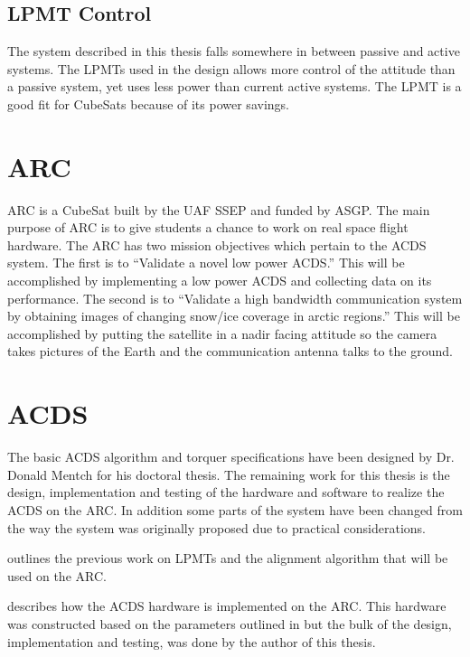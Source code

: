 \subsection{\acl*{LPMT} Control}

The system described in this thesis falls somewhere in between passive and active systems. The \acp{LPMT} used in the design allows more control of the attitude than a passive system, yet uses less power than current active systems. The \ac{LPMT} is a good fit for CubeSats because of its power savings.

\section{\acl*{ARC}}

\ac{ARC} is a CubeSat built by the UAF \ac{SSEP} and funded by \ac{ASGP}. The main purpose of \ac{ARC} is to give students a chance to work on real space flight hardware. The \ac{ARC} has two mission objectives which pertain to the \ac{ACDS} system. The first is to \enquote{Validate a novel low power \ac{ACDS}.}\cite{ARCweb} This will be accomplished by implementing a low power \ac{ACDS} and collecting data on its performance. The second is to \enquote{Validate a high bandwidth communication system by obtaining images of changing snow/ice coverage in arctic regions.}\cite{ARCweb} This will be accomplished by putting the satellite in a nadir facing attitude so the camera takes pictures of the Earth and the communication antenna talks to the ground.

\section{\acl*{ACDS}}

The basic \ac{ACDS} algorithm and torquer specifications have been designed by Dr. Donald Mentch for his doctoral thesis\cite{Mentch11}. The remaining work for this thesis is the design, implementation and testing of the hardware and software to realize the \ac{ACDS} on the \ac{ARC}. In addition some parts of the system have been changed from the way the system was originally proposed due to practical considerations.

 outlines the previous work on \acp{LPMT} and the alignment algorithm that will be used on the \ac{ARC}.

 describes how the \ac{ACDS} hardware is implemented on the \ac{ARC}. This hardware was constructed based on the parameters outlined in \cite{Mentch11} but the bulk of the design, implementation and testing, was done by the author of this thesis.

